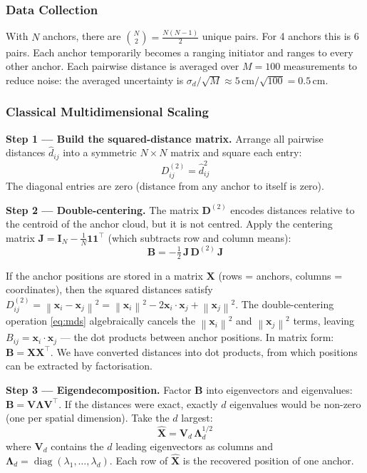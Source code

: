 \documentclass[11pt,a4paper]{article}
\newcommand{\vect}[1]{\bm{#1}}
\newcommand{\mat}[1]{\mathbf{#1}}
\newcommand{\norm}[1]{\left\|#1\right\|}
\newcommand{\Trans}{^{\top}}
\DeclareMathOperator{\diag}{diag}
\begin{document}
\subsubsection{Data Collection}

With $N$ anchors, there are $\binom{N}{2} = \frac{N(N-1)}{2}$ unique pairs. For 4 anchors this is 6 pairs. Each anchor temporarily becomes a ranging initiator and ranges to every other anchor. Each pairwise distance is averaged over $M=100$ measurements to reduce noise: the averaged uncertainty is $\sigma_d/\sqrt{M} \approx 5\,\text{cm}/\sqrt{100} = 0.5$\,cm.

\subsubsection{Classical Multidimensional Scaling}

\textbf{Step 1 --- Build the squared-distance matrix.} Arrange all pairwise distances $\hat{d}_{ij}$ into a symmetric $N\times N$ matrix and square each entry:
\[
D^{(2)}_{ij} = \hat{d}_{ij}^2
\]
The diagonal entries are zero (distance from any anchor to itself is zero).

\textbf{Step 2 --- Double-centering.} The matrix $\mat{D}^{(2)}$ encodes distances relative to the centroid of the anchor cloud, but it is not centred. Apply the centering matrix $\mat{J} = \mat{I}_N - \tfrac{1}{N}\vect{1}\vect{1}\Trans$ (which subtracts row and column means):
\begin{equation}
\mat{B} = -\tfrac{1}{2}\,\mat{J}\,\mat{D}^{(2)}\,\mat{J}
\label{eq:mds}
\end{equation}

\begin{intubox}
If the anchor positions are stored in a matrix $\mat{X}$ (rows = anchors, columns = coordinates), then the squared distances satisfy $D_{ij}^{(2)} = \norm{\vect{x}_i - \vect{x}_j}^2 = \norm{\vect{x}_i}^2 - 2\vect{x}_i\cdot\vect{x}_j + \norm{\vect{x}_j}^2$. The double-centering operation \cref{eq:mds} algebraically cancels the $\norm{\vect{x}_i}^2$ and $\norm{\vect{x}_j}^2$ terms, leaving $B_{ij} = \vect{x}_i \cdot \vect{x}_j$ --- the dot products between anchor positions. In matrix form: $\mat{B} = \mat{X}\mat{X}\Trans$. We have converted distances into dot products, from which positions can be extracted by factorisation.
\end{intubox}

\textbf{Step 3 --- Eigendecomposition.} Factor $\mat{B}$ into eigenvectors and eigenvalues: $\mat{B} = \mat{V}\mat{\Lambda}\mat{V}\Trans$. If the distances were exact, exactly $d$ eigenvalues would be non-zero (one per spatial dimension). Take the $d$ largest:
\begin{equation}
\hat{\mat{X}} = \mat{V}_d\,\mat{\Lambda}_d^{1/2}
\label{eq:mdssoln}
\end{equation}
where $\mat{V}_d$ contains the $d$ leading eigenvectors as columns and $\mat{\Lambda}_d = \diag(\lambda_1,\ldots,\lambda_d)$. Each row of $\hat{\mat{X}}$ is the recovered position of one anchor.
\end{document}
